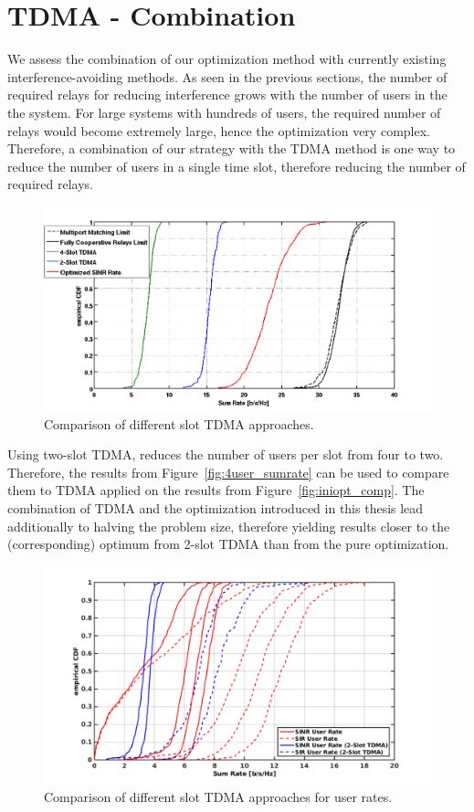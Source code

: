 \section{TDMA - Combination}
\label{sec:tdma_combination}
We assess the combination of our optimization method with currently existing interference-avoiding methods.
As seen in the previous sections, the number of required relays for reducing interference grows with the number of users in the the system.
For large systems with hundreds of users, the required number of relays would become extremely large, hence the optimization very complex.
Therefore, a combination of our strategy with the TDMA method is one way to reduce the number of users in a single time slot, therefore reducing the number of required relays.
\begin{figure}[h]
\centering
  \includegraphics[width=0.9\linewidth]{images/SlotTDMAcomparison_edited.png}
\caption{Comparison of different slot TDMA approaches.}
\label{fig:tdma_comb}
\end{figure}

Using two-slot TDMA, reduces the number of users per slot from four to two.
Therefore, the results from Figure~\ref{fig:4user_sumrate} can be used to compare them to TDMA applied on the results from Figure~\ref{fig:iniopt_comp}.
The combination of TDMA and the optimization introduced in this thesis lead additionally to halving the problem size, therefore yielding results closer to the (corresponding) optimum from 2-slot TDMA than from the pure optimization.
\begin{figure}[h]
\centering
  \includegraphics[width=0.9\linewidth]{images/SlotTDMAcomparison_user.png}
\caption{Comparison of different slot TDMA approaches for user rates.}
\label{fig:tdma_comb_user}
\end{figure}

